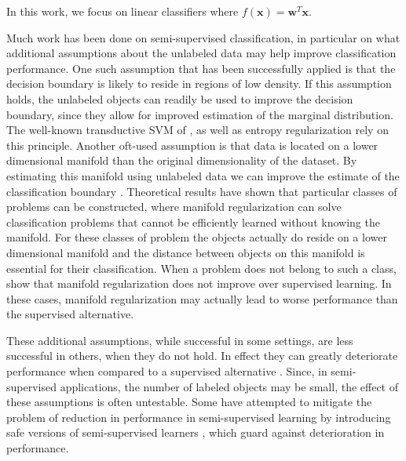 \documentclass{article}
\renewcommand{\vec}[1]{\mathbf{#1}}
\begin{document}
In this work, we focus on linear classifiers where $f(\vec{x})=\vec{w}^T \vec{x}$.

Much work has been done on semi-supervised classification, in particular on what additional assumptions about the unlabeled data may help improve classification performance. One such assumption that has been successfully applied is that the decision boundary is likely to reside in regions of low density. If this assumption holds, the unlabeled objects can readily be used to improve the decision boundary, since they allow for improved estimation of the marginal distribution. The well-known transductive SVM of \citet{Joachims1999}, as well as entropy regularization \citep{Grandvalet2005} rely on this principle. Another oft-used assumption is that data is located on a lower dimensional manifold than the original dimensionality of the dataset. By estimating this manifold using unlabeled data we can improve the estimate of the classification boundary \citep{Zhu2003}. Theoretical results have shown that particular classes of problems can be constructed, where manifold regularization can solve classification problems \citep{Niyogi2013} that cannot be efficiently learned without knowing the manifold. For these classes of problem the objects actually do reside on a lower dimensional manifold and the distance between objects on this manifold is essential for their classification. When a problem does not belong to such a class, \citet{Lafferty2007} show that manifold regularization does not improve over supervised learning. In these cases, manifold regularization may actually lead to worse performance than the supervised alternative.

These additional assumptions, while successful in some settings, are less successful in others, when they do not hold. In effect they can greatly deteriorate performance when compared to a supervised alternative \citep{Cozman2006}. Since, in semi-supervised applications, the number of labeled objects may be small, the effect of these assumptions is often untestable. Some have attempted to mitigate the problem of reduction in performance in semi-supervised learning by introducing safe versions of semi-supervised learners \citep{Li2011,Loog2010,Loog2014a}, which guard against deterioration in performance. 
\end{document}
